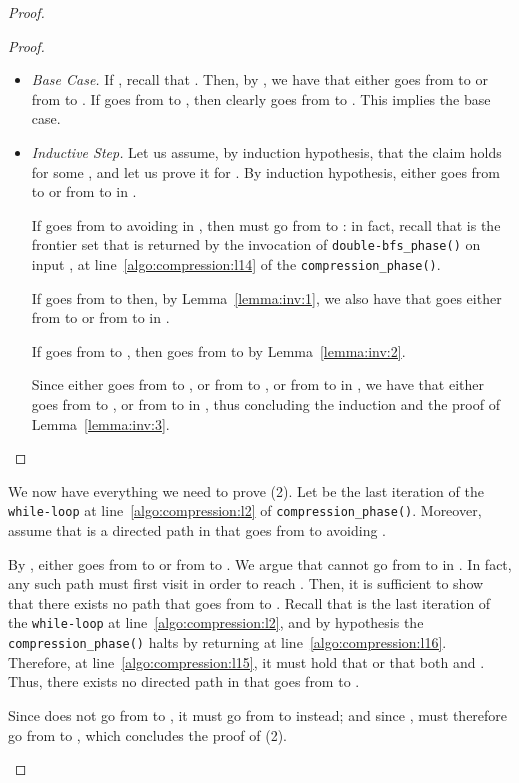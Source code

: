 \begin{proof}
\begin{enumerate}
\begin{itemize}
\begin{proof}
\begin{itemize}
\item \emph{Base Case.} If , recall that .
Then, by , we have that  either goes from
 to  or from  to .
If  goes from  to ,
then clearly  goes from  to .
This implies the base case.

\item \emph{Inductive Step.} Let us assume, by induction hypothesis,
that the claim holds for some , and let us prove it for .
By induction hypothesis,  either goes from  to 
or from  to  in .

If  goes from  to   avoiding  in ,
then  must go from  to :
in fact, recall that  is the frontier set that is returned
by the invocation of \texttt{double-bfs\_phase()} on input ,
at line~\ref{algo:compression:l14} of the \texttt{compression\_phase()}.

If  goes from  to  then, by Lemma~\ref{lemma:inv:1}, we also have that
 goes either from  to  or from
 to  in .

If  goes from  to ,
then  goes from  to  by Lemma~\ref{lemma:inv:2}.

Since  either goes from  to ,
or from  to , or from  to  in ,
we have that  either goes from  to , or from  to
 in ,
thus concluding the induction and the proof of Lemma~\ref{lemma:inv:3}.
\end{itemize}
\end{proof}
\end{itemize}

We now have everything we need to prove (2).
Let  be the last iteration of the \texttt{while-loop} at line~\ref{algo:compression:l2} of \texttt{compression\_phase()}.
Moreover, assume that  is a directed path in  that goes from  to  avoiding .

By ,  either goes from
 to  or from  to .
We argue that  cannot go from  to  in .
In fact, any such path must first visit  in order to reach .
Then, it is sufficient to show that there exists no path that goes from  to .
Recall that  is the last iteration of the \texttt{while-loop} at line~\ref{algo:compression:l2},
and by hypothesis the \texttt{compression\_phase()} halts by returning  at line~\ref{algo:compression:l16}.
Therefore, at line~\ref{algo:compression:l15}, it must hold that  or that both
 and .
Thus, there exists no directed path in  that goes from  to .

Since  does not go from  to ,
it must go from  to  instead; and since
,
 must therefore go from  to , which concludes the  proof of (2).
\end{enumerate}
\end{proof}

